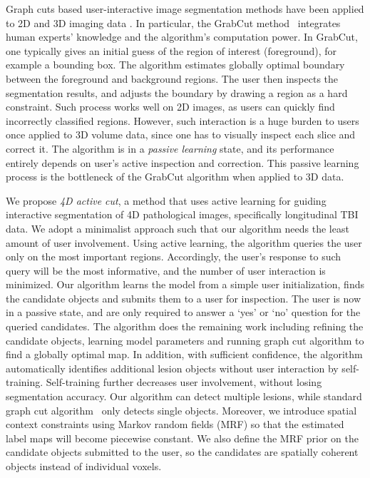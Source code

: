 \documentclass{article}
\begin{document}
Graph cuts based user-interactive image segmentation methods have been applied
to 2D and 3D imaging data \cite{boykov2001fast,rother2004grabcut}.  In
particular, the GrabCut method~\cite{rother2004grabcut} integrates human experts'
knowledge and the algorithm's computation power. In GrabCut, one typically gives
an initial guess of the region of interest (foreground), for example a bounding
box. The algorithm estimates globally optimal boundary between the foreground
and background regions. The user then inspects the segmentation results, and
adjusts the boundary by drawing a region as a hard constraint. Such process
works well on 2D images, as users can quickly find incorrectly classified
regions. However, such interaction is a huge burden to users once applied to 3D
volume data, since one has to visually inspect each slice and correct it.  The
algorithm is in a \emph{passive learning} state, and its performance entirely
depends on user's active inspection and correction. This passive learning
process is the bottleneck of the GrabCut algorithm when applied to 3D data.



We propose \emph{4D active cut}, a method that uses active learning
for guiding interactive segmentation of 4D pathological images,
specifically longitudinal TBI data.
We adopt a minimalist approach such that our
algorithm needs the least amount of user involvement.
Using active learning, the algorithm queries the user only on the most
important regions. Accordingly,
the user's response to such query will be the most informative, and the number
of user interaction is minimized. Our algorithm learns the model from a simple
user initialization, finds the candidate objects and submits them to a user for
inspection. The user is now in a passive state, and are only required
to answer a `yes' or `no' question for the queried candidates.
The algorithm does the remaining work
including refining the candidate objects, learning model parameters and running
graph cut algorithm to find a globally optimal map. In addition, with sufficient
confidence, the algorithm automatically identifies additional lesion objects
without user interaction by self-training. Self-training further decreases
user involvement, without losing segmentation accuracy.
Our algorithm can detect multiple lesions, while standard graph
cut algorithm~\cite{rother2004grabcut} only detects single objects. Moreover, we
introduce spatial context constraints using Markov random fields (MRF) so
that the estimated label maps will become piecewise constant.
We also define the MRF prior on the candidate objects submitted to the
user, so the candidates are spatially coherent objects instead of individual
 voxels.
\end{document}
